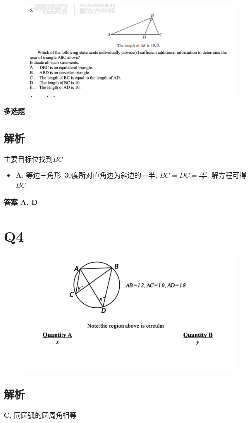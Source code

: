   \begin{figure}[H]
    \centering
    \includegraphics[width=0.7\columnwidth]{images/areas/geometry/q3}
  \end{figure}

  \textbf{多选题}

  \subsection{解析}

    主要目标位找到$ BC $

    \begin{itemize}
      \item \textbf{A}: 等边三角形, 30度所对直角边为斜边的一半,
      $ BC = DC = \frac{AC}{2} $, 解方程可得 $ BC $
    \end{itemize}

    \textbf{答案 A, D}

\section{Q4}

  \begin{figure}[H]
    \centering
    \includegraphics[width=0.7\columnwidth]{images/areas/geometry/q4}
  \end{figure}

  \subsection{解析}

    \textbf{C}, 同圆弧的圆周角相等

